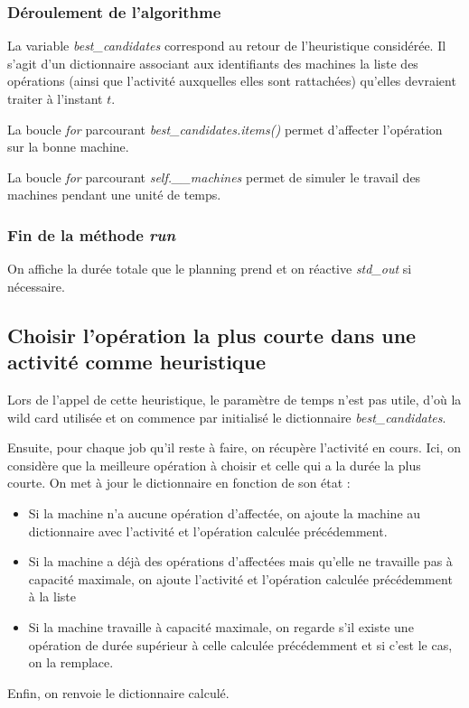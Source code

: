 \newpage

\subsubsection{Déroulement de l'algorithme}



La variable \textit{best\_candidates} correspond au retour de l'heuristique considérée. Il s'agit d'un dictionnaire associant aux identifiants des machines la liste des opérations (ainsi que l'activité auxquelles elles sont rattachées) qu'elles devraient traiter à l'instant $t$.

La boucle \textit{for} parcourant \textit{best\_candidates.items()} permet d'affecter l'opération sur la bonne machine.

La boucle \textit{for} parcourant \textit{self.\_\_machines} permet de simuler le travail des machines pendant une unité de temps.

\subsubsection{Fin de la méthode \textit{run}}



On affiche la durée totale que le planning prend et on réactive \textit{std\_out} si nécessaire. 

\newpage

\subsection{Choisir l'opération la plus courte dans une activité comme heuristique}



Lors de l'appel de cette heuristique, le paramètre de temps n'est pas utile, d'où la wild card utilisée et on commence par initialisé le dictionnaire \textit{best\_candidates}.



Ensuite, pour chaque job qu'il reste à faire, on récupère l'activité en cours. Ici, on considère que la meilleure opération à choisir et celle qui a la durée la plus courte. On met à jour le dictionnaire en fonction de son état :
\begin{itemize}
    \item Si la machine n'a aucune opération d'affectée, on ajoute la machine au dictionnaire avec l'activité et l'opération calculée précédemment.
    \item Si la machine a déjà des opérations d'affectées mais qu'elle ne travaille pas à capacité maximale, on ajoute l'activité et l'opération calculée précédemment à la liste
    \item Si la machine travaille à capacité maximale, on regarde s'il existe une opération de durée supérieur à celle calculée précédemment et si c'est le cas, on la remplace.
\end{itemize}



Enfin, on renvoie le dictionnaire calculé.